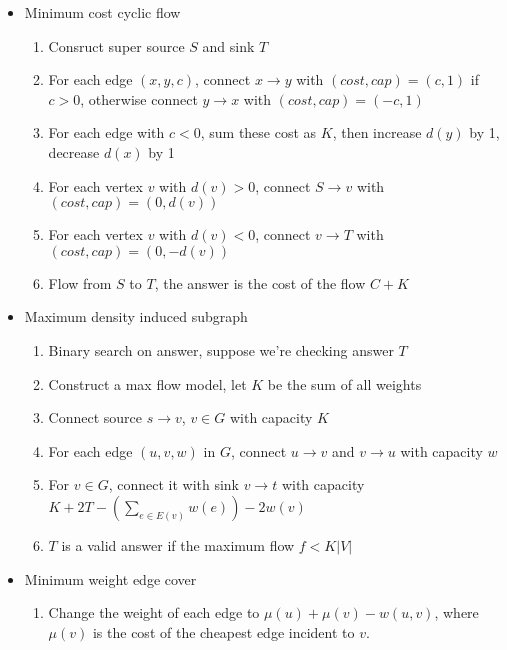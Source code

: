 \begin{itemize}
\begin{enumerate}
    \end{enumerate}
    \item Minimum cost cyclic flow
    \vspace{-0.5em}
    \begin{enumerate}
        \itemsep-0.3em
        \item Consruct super source $S$ and sink $T$
        \item For each edge $(x, y, c)$, connect $x \rightarrow y$ with $(cost, cap) = (c, 1)$ if $c > 0$, otherwise connect $y \rightarrow x$ with $(cost, cap) = (-c, 1)$
        \item For each edge with $c < 0$, sum these cost as $K$, then increase $d(y)$ by 1, decrease $d(x)$ by 1
        \item For each vertex $v$ with $d(v) > 0$, connect $S \rightarrow v$ with $(cost, cap) = (0, d(v))$
        \item For each vertex $v$ with $d(v) < 0$, connect $v \rightarrow T$ with $(cost, cap) = (0, -d(v))$
        \item Flow from $S$ to $T$, the answer is the cost of the flow $C + K$
    \end{enumerate}
    \item Maximum density induced subgraph
    \vspace{-1em}
    \begin{enumerate}
        \itemsep-0.3em
        \item Binary search on answer, suppose we're checking answer $T$
        \item Construct a max flow model, let $K$ be the sum of all weights
        \item Connect source $s \rightarrow v$, $v \in G$ with capacity $K$
        \item For each edge $(u, v, w)$ in $G$, connect $u \rightarrow v$ and $v \rightarrow u$ with capacity $w$
        \item For $v \in G$, connect it with sink $v \rightarrow t$ with capacity $K + 2T - (\sum_{e \in E(v)}{w(e)}) - 2w(v)$
        \item $T$ is a valid answer if the maximum flow $f < K \lvert V \rvert$
    \end{enumerate}
    \item Minimum weight edge cover
    \vspace{-1em}
    \begin{enumerate}
        \itemsep-0.3em
      \item Change the weight of each edge to $\mu(u) + \mu(v) - w(u, v)$, where $\mu(v)$ is the cost of the cheapest edge incident to $v$.

\end{enumerate}
\end{itemize}
